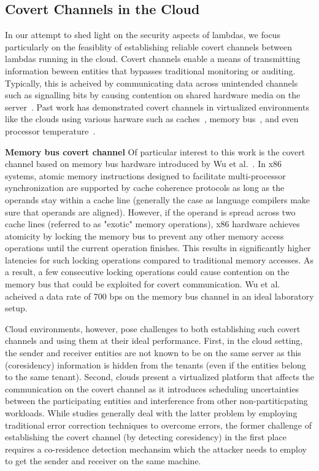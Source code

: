 \subsection{Covert Channels in the Cloud}
\label{sec:background:covertchannels}
In our attempt to shed light on the security aspects of lambdas, we focus 
particularly on the feasiblity of establishing reliable covert channels 
between lambdas running in the cloud. 
Covert channels enable a means of transmitting information beween entities 
that bypasses traditional monitoring or auditing. Typically, this is acheived 
by communicating data across unintended channels such as signalling bits by 
causing contention on shared hardware media on the server~\cite{L2cacheCovertChannels,
ProcessorCovertChannels,ThermalCovertChannel,SshOverCovertChannel,wuusenix2012}. 
Past work has demonstrated covert channels in virtualized environments like 
the clouds using various harware such as caches~\cite{ristenpartccs2009,L2cacheCovertChannels},
memory bus~\cite{wuusenix2012}, and even processor temperature~\cite{ThermalCovertChannel}.

\textbf{Memory bus covert channel} 
Of particular interest to this work is the covert channel based on memory bus 
hardware introduced by Wu et al.~\cite{wuusenix2012}. 
In x86 systems, atomic memory instructions designed to facilitate 
multi-processor synchronization are supported by cache coherence protocols as
long as the operands stay within a cache line (generally the case as language
compilers make sure that operands are aligned). However, if the operand is
spread across two cache lines (referred to as "exotic" memory operations), x86
hardware achieves atomicity by locking the memory bus to prevent any other
memory access operations until the current operation finishes. This results in
significantly higher latencies for such locking operations compared to traditional 
memory accesses. As a result, a few consecutive locking operations could cause 
contention on the memory bus that could be exploited for covert communication.
Wu et al. acheived a data rate of 700 bps on the memory bus channel in an 
ideal laboratory setup.

Cloud environments, however, pose challenges to both establishing  
such covert channels and using them at their ideal performance. First, in the 
cloud setting, the sender and receiver entities are not known to be on the same server 
as this (coresidency) information is hidden from the tenants (even if the entities belong to 
the same tenant). Second, clouds present a virtualized platform that affects 
the communication on the covert channel as it introduces scheduling uncertainties
between the participating entities and interference from other non-partiticpating 
workloads. While studies generally deal with the latter problem by employing 
traditional error correction techniques\cite{wuusenix2012} to overcome errors, 
the former challenge of establishing the covert channel (by detecting coresidency) 
in the first place requires a co-residence detection mechansim which the 
attacker needs to employ to get the sender and receiver on the same machine. 


